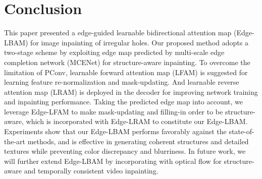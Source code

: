 \documentclass[10pt,journal,compsoc]{IEEEtran}
\begin{document}
%
%
%
%

%
%


\section{Conclusion}\label{sec:conclusion}
%
This paper presented a edge-guided learnable bidirectional attention map (Edge-LBAM) for image inpainting of irregular holes.
%
Our proposed method adopts a two-stage scheme by exploiting edge map predicted by multi-scale edge completion network (MCENet) for structure-aware inpainting.
%
To overcome the limitation of PConv, learnable forward attention map (LFAM) is suggested for learning feature re-normalization and mask-updating.
%
And learnable reverse attention map (LRAM) is deployed in the decoder for improving network training and inpainting performance.
%
Taking the predicted edge map into account, we leverage Edge-LFAM to make mask-updating and filling-in order to be structure-aware, which is incorporated with Edge-LRAM to constitute our Edge-LBAM.
%
Experiments show that our Edge-LBAM performs favorably against the state-of-the-art methods, and is effective in generating coherent structures and detailed textures while preventing color discrepancy and blurriness.
%
In future work, we will further extend Edge-LBAM by incorporating with optical flow for structure-aware and temporally consistent video inpainting.


%
%
%
\end{document}
